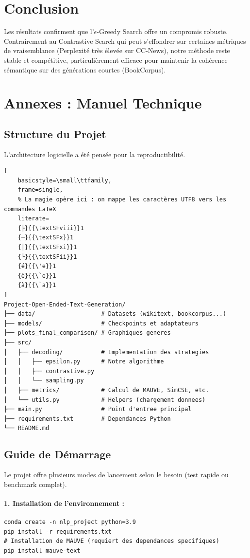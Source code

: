 \documentclass[12pt,a4paper]{article}
\begin{document}
\section{Conclusion}
Les r\'esultats confirment que l'$\epsilon$-Greedy Search offre un compromis robuste. Contrairement au Contrastive Search qui peut s'effondrer sur certaines m\'etriques de vraisemblance (Perplexit\'e tr\`es \'elev\'ee sur CC-News), notre m\'ethode reste stable et comp\'etitive, particuli\`erement efficace pour maintenir la coh\'erence s\'emantique sur des g\'en\'erations courtes (BookCorpus).

\newpage
\appendix
\section{Annexes : Manuel Technique}

\subsection{Structure du Projet}
L'architecture logicielle a \'et\'e pens\'ee pour la reproductibilit\'e.

\begin{lstlisting}[
    basicstyle=\small\ttfamily, 
    frame=single,
    % La magie opère ici : on mappe les caractères UTF8 vers les commandes LaTeX
    literate=
    {├}{{\textSFviii}}1
    {─}{{\textSFx}}1
    {│}{{\textSFxi}}1
    {└}{{\textSFii}}1
    {é}{{\'e}}1
    {è}{{\`e}}1
    {à}{{\`a}}1
]
Project-Open-Ended-Text-Generation/
├── data/                   # Datasets (wikitext, bookcorpus...)
├── models/                 # Checkpoints et adaptateurs
├── plots_final_comparison/ # Graphiques generes
├── src/
│   ├── decoding/           # Implementation des strategies
│   │   ├── epsilon.py      # Notre algorithme
│   │   ├── contrastive.py
│   │   └── sampling.py
│   ├── metrics/            # Calcul de MAUVE, SimCSE, etc.
│   └── utils.py            # Helpers (chargement donnees)
├── main.py                 # Point d'entree principal
├── requirements.txt        # Dependances Python
└── README.md
\end{lstlisting}

\subsection{Guide de D\'emarrage}
Le projet offre plusieurs modes de lancement selon le besoin (test rapide ou benchmark complet).

\paragraph{1. Installation de l'environnement :}
\begin{verbatim}
conda create -n nlp_project python=3.9
pip install -r requirements.txt
# Installation de MAUVE (requiert des dependances specifiques)
pip install mauve-text
\end{verbatim}
\end{document}
